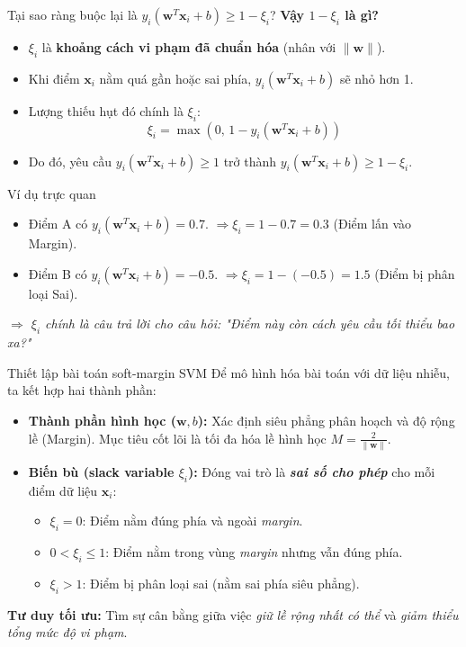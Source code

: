 \begin{frame}{Tại sao ràng buộc lại là $y_i(\bm{w}^T\bm{x}_i + b) \ge 1 - \xi_i$?}
    \textbf{Vậy $1 - \xi_i$ là gì?}
    \begin{itemize}
        \item $\xi_i$ là \textbf{khoảng cách vi phạm đã chuẩn hóa} (nhân với $\|\bm{w}\|$).
        \item Khi điểm $\bm{x}_i$ nằm quá gần hoặc sai phía, $y_i(\bm{w}^T\bm{x}_i + b)$ sẽ nhỏ hơn 1.
        \item Lượng thiếu hụt đó chính là $\xi_i$: 
        \[
        \xi_i = \max(0,\, 1 - y_i(\bm{w}^T\bm{x}_i + b))
        \]
        \item Do đó, yêu cầu $y_i(\bm{w}^T\bm{x}_i + b) \ge 1$ trở thành $y_i(\bm{w}^T\bm{x}_i + b) \ge 1 - \xi_i$.
    \end{itemize}
    \begin{exampleblock}{Ví dụ trực quan}
    \begin{itemize}
      \item Điểm A có $y_i(\bm{w}^T\bm{x}_i + b) = 0.7$. $\Rightarrow \xi_i = 1 - 0.7 = 0.3$ (Điểm lấn vào Margin).
      \item Điểm B có $y_i(\bm{w}^T\bm{x}_i + b) = -0.5$. $\Rightarrow \xi_i = 1 - (-0.5) = 1.5$ (Điểm bị phân loại Sai).
    \end{itemize}
    \textit{$\Rightarrow$ $\xi_i$ chính là câu trả lời cho câu hỏi: "Điểm này còn cách yêu cầu tối thiểu bao xa?"}
  \end{exampleblock}
\end{frame}

\begin{frame}{Thiết lập bài toán soft-margin SVM}
  Để mô hình hóa bài toán với dữ liệu nhiễu, ta kết hợp hai thành phần:
  
  \begin{itemize}
    \item \textbf{Thành phần hình học ($\mathbf{w}, b$):} 
    Xác định siêu phẳng phân hoạch và độ rộng lề (Margin). Mục tiêu cốt lõi là tối đa hóa lề hình học $M = \frac{2}{\|\mathbf{w}\|}$.
    
    \item \textbf{Biến bù (slack variable $\xi_i$):} 
    Đóng vai trò là \textit{\textbf{sai số cho phép}} cho mỗi điểm dữ liệu $\mathbf{x}_i$:
    \begin{itemize}
      \item $\xi_i = 0$: Điểm nằm đúng phía và ngoài \textit{margin}.
      \item $0 < \xi_i \le 1$: Điểm nằm trong vùng \textit{margin} nhưng vẫn đúng phía.
      \item $\xi_i > 1$: Điểm bị phân loại sai (nằm sai phía siêu phẳng).
    \end{itemize}
  \end{itemize}
  
  \vspace{0.3cm}
  \textbf{Tư duy tối ưu:} Tìm sự cân bằng giữa việc \textit{giữ lề rộng nhất có thể} và \textit{giảm thiểu tổng mức độ vi phạm}.
\end{frame}

